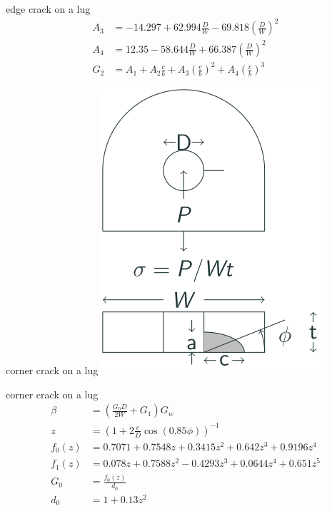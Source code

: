 \documentclass[
  letterpaper,
  ignorenonframetext,
  aspectratio=43,
  handout,
  12pt]{beamer}
\let\Oldincludegraphics\includegraphics
\renewcommand{\includegraphics}[2][]{\Oldincludegraphics[width=\textwidth,height=0.7\textheight,keepaspectratio]{#2}}
\begin{document}
\begin{frame}{edge crack on a lug}
\protect\hypertarget{edge-crack-on-a-lug-3}{}
\[\begin{aligned}
    A_3 &= -14.297 + 62.994 \frac{D}{W} - 69.818 \left(\frac{D}{W}\right)^2\\
    A_4 &= 12.35 - 58.644 \frac{D}{W} + 66.387 \left(\frac{D}{W}\right)^2\\
    G_2 &= A_1 + A_2 \frac{c}{b} + A_3 \left(\frac{c}{b}\right)^2 + A_4 \left(\frac{c}{b}\right)^3
\end{aligned}\]
\end{frame}

\begin{frame}{corner crack on a lug}
\protect\hypertarget{corner-crack-on-a-lug}{}
\includegraphics{../images/bearing-single-corner.svg}
\end{frame}

\begin{frame}{corner crack on a lug}
\protect\hypertarget{corner-crack-on-a-lug-1}{}
\[\begin{aligned}
  \beta &= \left(\frac{G_0 D}{2W} + G_1\right)G_w\\
  z &= \left(1 + 2\frac{c}{D} \cos (0.85 \phi)\right)^{-1}\\
  f_0(z) &= 0.7071 + 0.7548z + 0.3415z^2 + 0.642z^3 + 0.9196z^4\\
  f_1(z) &= 0.078z + 0.7588z^2 - 0.4293z^3 + 0.0644z^4 + 0.651z^5\\
  G_0 &= \frac{f_0(z)}{d_0}\\
  d_0 &= 1 + 0.13z^2
\end{aligned}\]
\end{frame}
\end{document}
